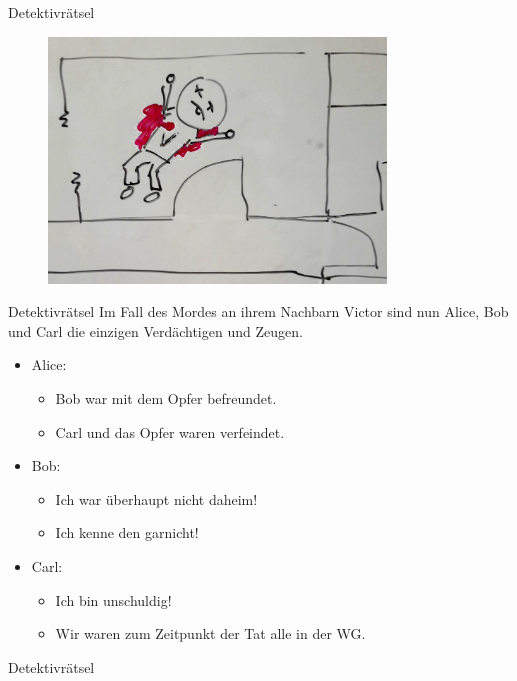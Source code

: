 \documentclass{beamer}
\begin{document}
\begin{frame}{Detektivrätsel}
	\begin{figure}
		\includegraphics[width=0.8\textwidth]{images/victor}
	\end{figure}
\end{frame}

\begin{frame}{Detektivrätsel}
	Im Fall des Mordes an ihrem Nachbarn Victor sind nun Alice, Bob und Carl die einzigen Verdächtigen und Zeugen.
	\begin{itemize}
		\item Alice:
		\begin{itemize}
			\item Bob war mit dem Opfer befreundet.
			\item Carl und das Opfer waren verfeindet.
		\end{itemize}
		\item Bob:
		\begin{itemize}
			\item Ich war überhaupt nicht daheim!
			\item Ich kenne den garnicht!
		\end{itemize}
		\item Carl:
		\begin{itemize}
			\item Ich bin unschuldig!
			\item Wir waren zum Zeitpunkt der Tat alle in der WG.
		\end{itemize}
	\end{itemize}
\end{frame}

\begin{frame}{Detektivrätsel}
\end{frame}
\end{document}
